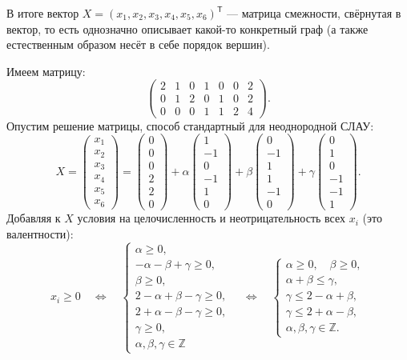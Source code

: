 \documentclass[12pt,a4paper]{article}
\newcommand{\col}[1]{\begin{pmatrix}#1\end{pmatrix}}
\begin{document}
В итоге вектор $X=(x_1,x_2,x_3,x_4,x_5,x_6)^{\mathsf T}$ --- матрица
смежности, свёрнутая в вектор, то есть однозначно описывает какой-то
конкретный граф (а также естественным образом несёт в себе порядок вершин).

Имеем матрицу:
\[
\left(\begin{array}{rrrrrr|r}
2&1&0&1&0&0&2\\
0&1&2&0&1&0&2\\
0&0&0&1&1&2&4
\end{array}\right).
\]
Опустим решение матрицы, способ стандартный для неоднородной СЛАУ:
\[
X=\col{x_1\\x_2\\x_3\\x_4\\x_5\\x_6}
=\col{0\\0\\0\\2\\2\\0}
+\alpha\col{1\\-1\\0\\-1\\1\\0}
+\beta\col{0\\-1\\1\\1\\-1\\0}
+\gamma\col{0\\1\\0\\-1\\-1\\1}.
\]
Добавляя к $X$ условия на целочисленность и неотрицательность всех $x_i$
(это валентности):
\[
x_i\geq0\quad\Longleftrightarrow\quad
\begin{cases}
\alpha\geq0,\\
-\alpha-\beta+\gamma\geq0,\\
\beta\geq0,\\
2-\alpha+\beta-\gamma\geq0,\\
2+\alpha-\beta-\gamma\geq0,\\
\gamma\geq0,\\
\alpha,\beta,\gamma\in\mathbb Z
\end{cases}
\quad\Longleftrightarrow\quad
\begin{cases}
\alpha\geq0,\quad\beta\geq0,\\
\alpha+\beta\leq\gamma,\\
\gamma\leq2-\alpha+\beta,\\
\gamma\leq2+\alpha-\beta,\\
\alpha,\beta,\gamma\in\mathbb Z.
\end{cases}
\]
\end{document}
